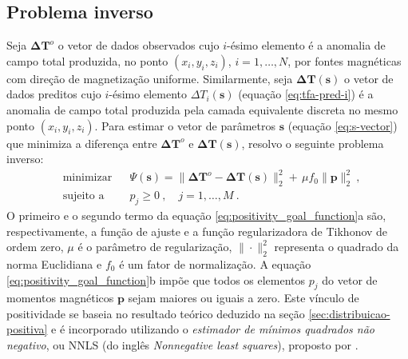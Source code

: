 \subsection{Problema inverso}
\label{subsec:mag_dir_prob_inv}

Seja $\mathbf{\Delta T}^{o}$ o vetor de dados observados cujo $i$-ésimo elemento é a anomalia de campo 
total produzida, no ponto $(x_{i},y_{i},z_{i})$, $i = 1, \dots, N$, por fontes magnéticas com direção de 
magnetização uniforme. Similarmente, seja $\mathbf{\Delta T} (\mathbf{s})$ o vetor de dados preditos cujo 
$i$-ésimo elemento $\Delta T_{i}(\mathbf{s})$ (equação \ref{eq:tfa-pred-i}) é a anomalia de campo total 
produzida pela camada equivalente discreta no mesmo ponto $(x_{i},y_{i},z_{i})$. 
Para estimar o vetor de parâmetros $\mathbf{s}$ (equação \ref{eq:s-vector}) que minimiza a diferença 
entre $\mathbf{\Delta T}^{o}$ e $\mathbf{\Delta T}(\mathbf{s})$, resolvo o seguinte problema inverso:
\begin{subequations}
	\begin{align}
	& \text{minimizar}
	& &\Psi(\mathbf{s}) =\lVert \mathbf{\Delta T}^{o} - \mathbf{\Delta T} (\mathbf{s}) 
	\rVert_{2}^{2} + \, \mu f_0 \parallel \mathbf{p} \parallel_{2}^{2} \: , \\
	& \text{sujeito a}
	& & p_{j} \geqslant 0 \: , \quad j = 1, \dots, M \: .
	\end{align}
	\label{eq:positivity_goal_function}
\end{subequations}
O primeiro e o segundo termo da equação \ref{eq:positivity_goal_function}a são, respectivamente, a função de ajuste e a função 
regularizadora de Tikhonov de ordem zero, $\mu$ é o parâmetro de regularização, $\| \cdot \|_{2}^{2}$ representa o quadrado da 
norma Euclidiana e $f_{0}$ é um fator de normalização. A equação \ref{eq:positivity_goal_function}b impõe que todos os elementos 
$p_{j}$ do vetor de momentos magnéticos $\mathbf{p}$ sejam maiores ou iguais a zero. 
Este vínculo de positividade se baseia no resultado teórico deduzido na seção \ref{sec:distribuicao-positiva} e 
é incorporado utilizando o \textit{estimador de mínimos quadrados não negativo}, ou NNLS 
(do inglês \textit{Nonnegative least squares}), proposto por \citep{lawson_hanson_1974}.

